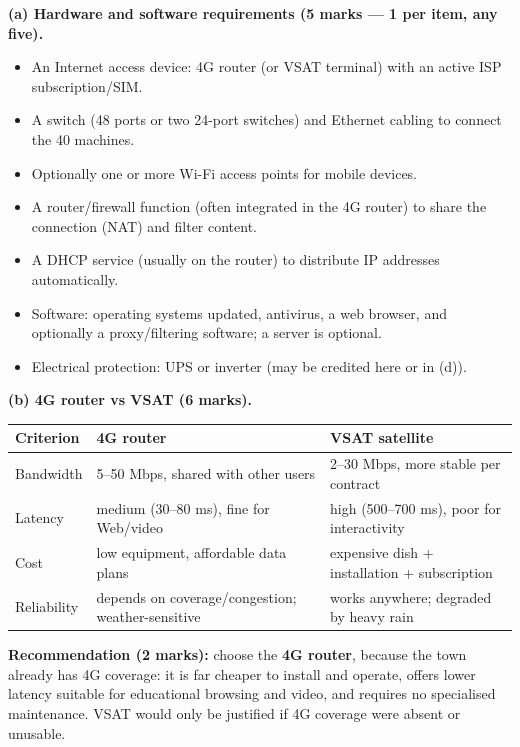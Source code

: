 \documentclass[11pt]{article}
\begin{document}
\begin{corrige}
\textbf{(a) Hardware and software requirements (5 marks — 1 per item, any five).}
\begin{itemize}
\item An Internet access device: 4G router (or VSAT terminal) with an active ISP subscription/SIM.
\item A switch (48 ports or two 24-port switches) and Ethernet cabling to connect the 40 machines.
\item Optionally one or more Wi-Fi access points for mobile devices.
\item A router/firewall function (often integrated in the 4G router) to share the connection (NAT) and filter content.
\item A DHCP service (usually on the router) to distribute IP addresses automatically.
\item Software: operating systems updated, antivirus, a web browser, and optionally a proxy/filtering software; a server is optional.
\item Electrical protection: UPS or inverter (may be credited here or in (d)).
\end{itemize}

\textbf{(b) 4G router vs VSAT (6 marks).}

\begin{center}
\begin{tabularx}{\linewidth}{|l|X|X|}\hline
\rowcolor{popblueL} \textbf{Criterion} & \textbf{4G router} & \textbf{VSAT satellite} \\ \hline
Bandwidth & 5--50 Mbps, shared with other users & 2--30 Mbps, more stable per contract \\ \hline
Latency & medium (30--80 ms), fine for Web/video & high (500--700 ms), poor for interactivity \\ \hline
Cost & low equipment, affordable data plans & expensive dish + installation + subscription \\ \hline
Reliability & depends on coverage/congestion; weather-sensitive & works anywhere; degraded by heavy rain \\ \hline
\end{tabularx}
\end{center}

\textbf{Recommendation (2 marks):} choose the \textbf{4G router}, because the town already has 4G coverage: it is far cheaper to install and operate, offers lower latency suitable for educational browsing and video, and requires no specialised maintenance. VSAT would only be justified if 4G coverage were absent or unusable.


\end{corrige}
\end{document}

